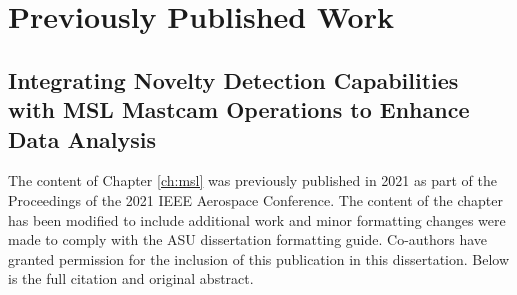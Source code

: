 \chapter{Previously Published Work}
\section{Integrating Novelty Detection Capabilities with MSL Mastcam Operations to Enhance Data Analysis}
The content of Chapter \ref{ch:msl} was previously published in 2021 as part of the Proceedings of the 2021 IEEE Aerospace Conference.
The content of the chapter has been modified to include additional work and minor formatting changes were made to comply with the ASU dissertation formatting guide.
Co-authors have granted permission for the inclusion of this publication in this dissertation. 
Below is the full citation and original abstract.
\begin{refsection}
  \nocite{horton2021integrating}
  \printbibliography[heading=none]
\end{refsection}
